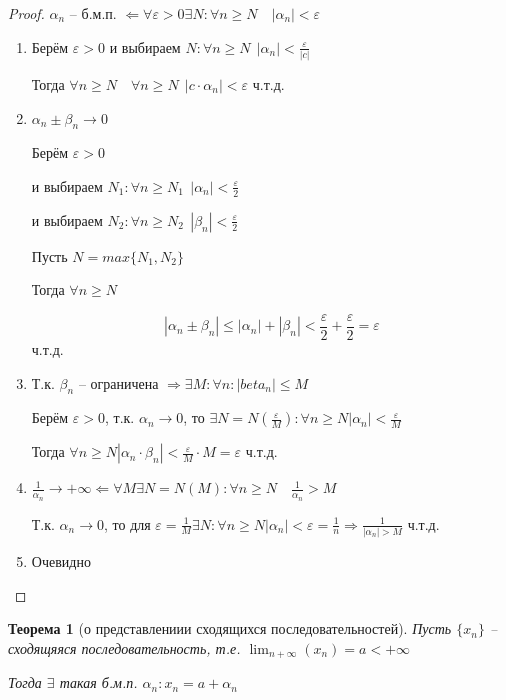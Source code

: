 \documentclass{book}
\newtheorem{Th}{Теорема}[chapter]
\begin{document}
\begin{proof}
	$\alpha_n$ -- б.м.п. $\Longleftarrow \forall \varepsilon >0 \exists N: \forall n \geqslant N\quad |\alpha_n|<\varepsilon$
	
	\begin{enumerate}
		\item Берём $\varepsilon >0$ и выбираем $N: \forall n \geqslant	N ~~ |\alpha_n|<\frac{\varepsilon}{|c|}$
		
		Тогда $\forall n \geqslant N \quad \forall n \geqslant N ~~ |c\cdot \alpha_n|<\varepsilon$ ч.т.д.
		\item $\alpha_n \pm \beta_n \to 0$
		
		Берём $\varepsilon > 0$ 
		
		и выбираем $N_1: \forall n \geqslant N_1~~|\alpha_n|<\frac{\varepsilon}{2}$
		
		и выбираем $N_2: \forall n \geqslant N_2~~|\beta_n|<\frac{\varepsilon}{2}$
		
		Пусть $N = max\{N_1, N_2\}$
		
		Тогда $\forall n \geqslant N$
		
		$$|\alpha_n\pm \beta_n|\leqslant |\alpha_n|+|\beta_n|<\frac{\varepsilon}{2}+\frac{\varepsilon}{2}=\varepsilon$$ ч.т.д.
		\item Т.к. $\beta_n$ -- ограничена $\Rightarrow \exists M:\forall n:|beta_n|\leqslant M$
		
		Берём $\varepsilon >0$, т.к. $\alpha_n \to 0$, то $\exists N = N(\frac{\varepsilon}{M}): \forall n \geqslant N |\alpha_n|<\frac{\varepsilon}{M}$
		
		Тогда $\forall n \geqslant N |\alpha_n\cdot \beta_n|<\frac{\varepsilon}{M} \cdot M = \varepsilon$ ч.т.д.
		\item $\frac{1}{\alpha_n}\to +\infty \Longleftarrow \forall M \exists N = N(M): \forall n \geqslant N\quad \frac{1}{\alpha_n}>M$
		
		Т.к. $\alpha_n \to 0$, то для $\varepsilon = \frac{1}{M} \exists N:\forall n \geqslant N |\alpha_n|<\varepsilon = \frac{1}{n} \Rightarrow \frac{1}{|\alpha_n|>M}$ ч.т.д.
		\item Очевидно
	\end{enumerate}
\end{proof}

\begin{Th}[о представлениии сходящихся последовательностей]
	Пусть $\{x_n\}$ -- сходящяяся последовательность, т.е. $\lim_{n+\infty}(x_n) = a < + \infty$
	
	Тогда $\exists$ такая б.м.п. $\alpha_n:x_n = a + \alpha_n$
\end{Th}
\end{document}
